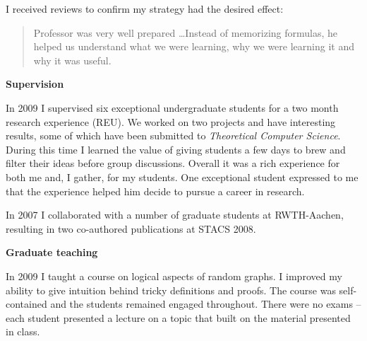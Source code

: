 \documentclass{article}[12pt]
\theoremstyle{plain} \numberwithin{equation}{section}
\theoremstyle{definition}
\begin{document}
I received reviews to confirm my strategy had the desired effect:
\begin{quote}
Professor was very well prepared \dots Instead of memorizing formulas, he helped us understand what we were learning, why we
were learning it and why it was useful.
\end{quote}

{\bf Supervision}

In 2009 I supervised six exceptional undergraduate students for a two month research experience (REU). We worked on two projects and have interesting results, some of which have been submitted to {\em Theoretical Computer Science}. During this time I learned the value of giving students a few days to brew and filter their ideas before group discussions.
Overall it was a rich experience for both me and, I gather, for my students. One exceptional student expressed to me that the experience helped him decide to pursue a career in research.

In 2007 I collaborated with a number of graduate students at RWTH-Aachen, resulting in two co-authored publications at STACS 2008.

{\bf Graduate teaching}


In 2009 I taught a course on logical aspects of random graphs. I improved my ability to give intuition
behind tricky definitions and proofs. The course was self-contained and the students remained engaged throughout. 
There were no exams -- each student presented a lecture on a topic that built on the material presented in class.
\end{document}
